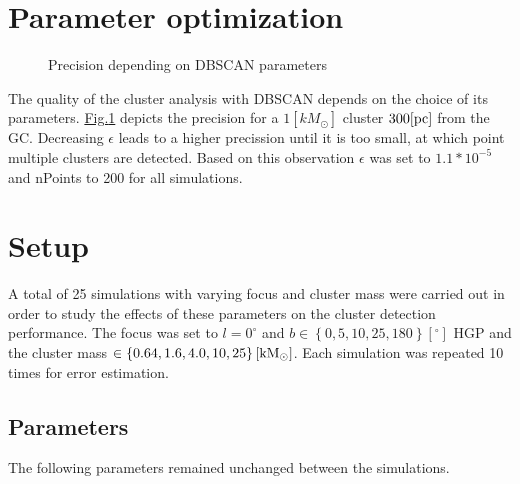 \documentclass[letterpaper,10pt,english]{sphinxmanual}
\begin{document}
\section{Parameter optimization}
\label{\detokenize{NBodySimulation/Experiments:parameter-optimization}}
\begin{figure}[htbp]
\centering
\capstart

\noindent{}
\caption{Precision depending on DBSCAN parameters}\label{\detokenize{NBodySimulation/Experiments:id2}}\label{\detokenize{NBodySimulation/Experiments:fig-dbscan}}\end{figure}

\sphinxAtStartPar
The quality of the cluster analysis with DBSCAN depends on the choice of its parameters.
\hyperref[\detokenize{NBodySimulation/Experiments:fig-dbscan}]{Fig.\@ \ref{\detokenize{NBodySimulation/Experiments:fig-dbscan}}} depicts the precision for a \(1 [kM_\odot]\) cluster \(300 \textup{[pc]}\) from the GC.
Decreasing \(\epsilon\) leads to a higher precission until it is too small, at which point multiple clusters are detected.
Based on this observation \(\epsilon\) was set to \(1.1*10^{-5}\) and nPoints to 200 for all simulations.


\section{Setup}
\label{\detokenize{NBodySimulation/Experiments:setup}}
\sphinxAtStartPar
A total of 25 simulations with varying focus and cluster mass were carried out in order to study the effects of these parameters on the cluster detection performance.
The focus was set to \(l=0^{\circ}\) and \(b \in \left \{0,5,10,25,180 \right \}[^\circ]\) HGP and the cluster mass \(\in \left \{0.64, 1.6, 4.0, 10, 25 \right \} [\textup{kM}_\odot]\).
Each simulation was repeated 10 times for error estimation.


\subsection{Parameters}
\label{\detokenize{NBodySimulation/Experiments:parameters}}\label{\detokenize{NBodySimulation/Experiments:parameters-label}}
\sphinxAtStartPar
The following parameters remained unchanged between the simulations.
\end{document}
